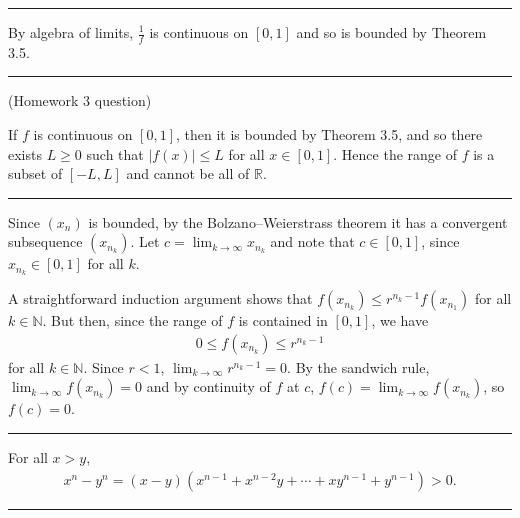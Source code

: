 \documentclass[letterpaper,10pt,english]{jupyterBook}
\begin{document}
\bigskip\hrule\bigskip


\sphinxAtStartPar
{\hyperref[\detokenize{Problems:id28}]{}} By algebra of limits, \(\frac{1}{f}\) is continuous on \([0, 1]\) and so is bounded by Theorem 3.5.


\bigskip\hrule\bigskip


\sphinxAtStartPar
{\hyperref[\detokenize{Problems:id29}]{}} (Homework 3 question)

If \(f\) is continuous on \([0, 1]\), then it is bounded by Theorem 3.5, and so there exists \(L \geq 0\) such that \(|f(x)| \leq L\) for all \(x \in [0, 1]\). Hence the range of \(f\) is a subset of  \([-L, L]\) and cannot be all of \(\mathbb{R}\).


\bigskip\hrule\bigskip


\sphinxAtStartPar
{\hyperref[\detokenize{Problems:id30}]{}} Since \((x_{n})\) is bounded, by the Bolzano–Weierstrass theorem it has a convergent subsequence \((x_{n_{k}})\). Let \(c=\lim_{k \rightarrow \infty}x_{n_{k}}\) and note that \(c \in [0, 1]\), since \(x_{n_k}\in[0,1]\) for all \(k\).

A straight\sphinxhyphen{}forward induction argument shows that \(f(x_{n_{k}}) \leq r^{n_{k}-1}f(x_{n_{1}})\) for all \(k\in\mathbb{N}\). But then, since the range of \(f\) is contained in \([0,1]\), we have
\begin{equation*}
\begin{split}
0 \leq f(x_{n_{k}}) \leq r^{n_{k}-1}
\end{split}
\end{equation*}
\sphinxAtStartPar
for all \(k\in\mathbb{N}\). Since \(r < 1\), \(\lim_{k\to\infty} r^{n_k-1} =0\). By the sandwich rule, \( \lim_{k \rightarrow \infty}f(x_{n_{k}}) = 0\) and by continuity of \(f\) at \(c\), \(f(c) = \lim_{k \rightarrow \infty}f(x_{n_{k}})\), so \(f(c)=0\).


\bigskip\hrule\bigskip


\sphinxAtStartPar
{\hyperref[\detokenize{Problems:id31}]{}} For all \(x > y\),
\begin{equation*}
\begin{split}
x^{n} - y^{n} = (x - y)(x^{n-1} + x^{n-2}y + \cdots + xy^{n-1} + y^{n-1}) > 0.
\end{split}
\end{equation*}

\bigskip\hrule\bigskip
\end{document}
